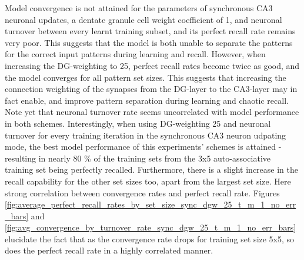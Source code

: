 
Model convergence is not attained for the parameters of synchronous CA3 neuronal updates, a dentate granule cell weight coefficient of 1, and neuronal turnover between every learnt training subset, and its perfect recall rate remains very poor. This suggests that the model is both unable to separate the patterns for the correct input patterns during learning and recall. However, when increasing the DG-weighting to 25, perfect recall rates become twice as good, and the model converges for all pattern set sizes. This suggests that increasing the connection weighting of the synapses from the DG-layer to the CA3-layer may in fact enable, and improve pattern separation during learning and chaotic recall. Note yet that neuronal turnover rate seems uncorrelated with model performance in both schemes. Interestingly, when using DG-weighting 25 and neuronal turnover for every training iteration in the synchronous CA3 neuron udpating mode, the best model performance of this experiments' schemes is attained - resulting in  nearly 80 \% of the training sets from the 3x5 auto-associative training set being perfectly recalled. Furthermore, there is a slight increase in the recall capability for the other set sizes too, apart from the largest set size. Here strong correlation between convergence rates and perfect recall rate. Figures \ref{fig:average_perfect_recall_rates_by_set_size_sync_dgw_25_t_m_1_no_err_bars} and \ref{fig:avg_convergence_by_turnover_rate_sync_dgw_25_t_m_1_no_err_bars} elucidate the fact that as the convergence rate drops for training set size 5x5, so does the perfect recall rate in a highly correlated manner.


